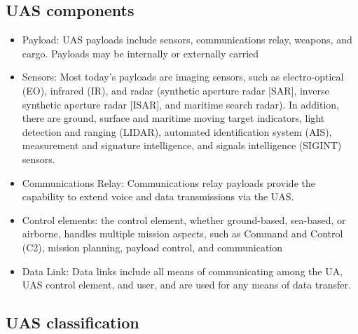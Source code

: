 \subsection{UAS components} 
\begin{itemize}

\item Payload:  UAS payloads include sensors, communications relay, weapons, and cargo. Payloads may be internally or externally carried 
\item Sensors: Most today’s payloads are imaging sensors, such as electro-optical (EO), infrared (IR), and radar (synthetic aperture radar [SAR], inverse synthetic aperture radar [ISAR], and maritime search radar). In addition, there are ground, surface and maritime moving target indicators, light detection and ranging (LIDAR), automated identification system (AIS), measurement and signature intelligence, and signals intelligence (SIGINT) sensors. 
\item Communications Relay: Communications relay payloads provide the capability to extend voice and data transmissions via the UAS. 
\item Control elements: the control element, whether ground-based, sea-based, or airborne, handles multiple mission aspects, such as Command and Control (C2), mission planning, payload control, and communication 
\item Data Link: Data links include all means of communicating among the UA, UAS control element, and user, and are used for any means of data transfer. \cite{Joint}
\end{itemize}

\subsection{UAS classification}
